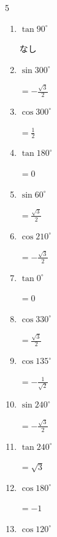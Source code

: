 \begin{multicols}{5}
\begin{enumerate}
        $\displaystyle =-\sqrt{3}$

  \item $\displaystyle \tan{90^\circ}$

        $\displaystyle なし$

  \item $\displaystyle \sin{300^\circ}$

        $\displaystyle =-\frac{\sqrt{3}}{2}$

\columnbreak %

  \item $\displaystyle \cos{300^\circ}$

        $\displaystyle =\frac{1}{2}$

  \item $\displaystyle \tan{180^\circ}$

        $\displaystyle =0$

  \item $\displaystyle \sin{60^\circ}$

        $\displaystyle =\frac{\sqrt{3}}{2}$

  \item $\displaystyle \cos{210^\circ}$

        $\displaystyle =-\frac{\sqrt{3}}{2}$

  \item $\displaystyle \tan{0^\circ}$

        $\displaystyle =0$

  \item $\displaystyle \cos{330^\circ}$

        $\displaystyle =\frac{\sqrt{3}}{2}$

  \item $\displaystyle \cos{135^\circ}$

        $\displaystyle =-\frac{1}{\sqrt{2}}$

  \item $\displaystyle \sin{240^\circ}$

        $\displaystyle =-\frac{\sqrt{3}}{2}$

  \item $\displaystyle \tan{240^\circ}$

        $\displaystyle =\sqrt{3}$

  \item $\displaystyle \cos{180^\circ}$

        $\displaystyle =-1$

  \item $\displaystyle \cos{120^\circ}$


\end{enumerate}
\end{multicols}
